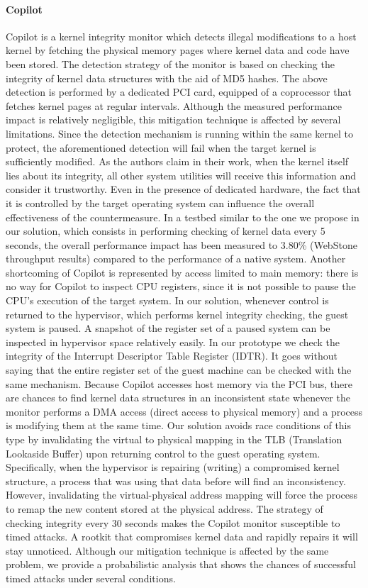 \paragraph{Copilot}
Copilot \cite{copilot} is a kernel integrity monitor which detects illegal modifications to a host kernel by fetching the physical memory pages where kernel data and code have been stored. The detection strategy of the monitor is based on checking the integrity of kernel data structures with the aid of MD5 hashes. The above detection is performed by a dedicated PCI card, equipped of a coprocessor that fetches kernel pages at regular intervals. Although the measured performance impact is relatively negligible, this mitigation technique is affected by several limitations. Since the detection mechanism is running within the same kernel to protect, the aforementioned detection will fail when the target kernel is sufficiently modified. As the authors claim in their work, when the kernel itself lies about its integrity, all other system utilities will receive this information and consider it trustworthy. Even in the presence of dedicated hardware, the fact that it is controlled by the target operating system can influence the overall effectiveness of the countermeasure. 
In a testbed similar to the one we propose in our solution, which consists in performing checking of kernel data every 5 seconds, the overall performance impact has been measured to 3.80\% (WebStone throughput results) compared to the performance of a native system.   
Another shortcoming of Copilot is represented by access limited to main memory: there is no way for Copilot to inspect CPU registers, since it is not possible to pause the CPU's execution of the target system. In our solution, whenever control is returned to the hypervisor, which performs kernel integrity checking, the guest system is paused. A snapshot of the register set of a paused system can be inspected in hypervisor space relatively easily. In our prototype we check the integrity of the Interrupt Descriptor Table Register (IDTR). It goes without saying that the entire register set of the guest machine can be checked with the same mechanism. 
Because Copilot accesses host memory via the PCI bus, there are chances to find kernel data structures in an inconsistent state whenever the monitor performs a DMA access (direct access to physical memory) and a process is modifying them at the same time. Our solution avoids race conditions of this type by invalidating the virtual to physical mapping in the TLB (Translation Lookaside Buffer) upon returning control to the guest operating system. Specifically, when the hypervisor is repairing (writing) a compromised kernel structure, a process that was using that data before will find an inconsistency. However, invalidating the virtual-physical address mapping will force the process to remap the new content stored at the physical address.
The strategy of checking integrity every 30 seconds makes the Copilot monitor susceptible to timed attacks. A rootkit that compromises kernel data and rapidly repairs it will stay unnoticed. Although our mitigation technique is affected by the same problem, we provide a probabilistic analysis that shows the chances of successful timed attacks under several conditions.

